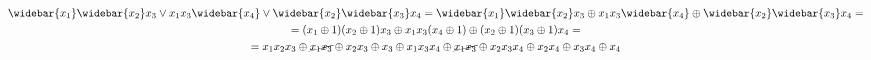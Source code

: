 \begin{multline*}
    \widebar{x_1}\widebar{x_2}x_3 \lor x_1x_3\widebar{x_4} \lor \widebar{x_2}\widebar{x_3}x_4=\widebar{x_1}\widebar{x_2}x_3 \oplus x_1x_3\widebar{x_4} \oplus \widebar{x_2}\widebar{x_3}x_4=\\
=(x_1 \oplus 1)(x_2 \oplus 1)x_3 \oplus x_1x_3(x_4 \oplus 1) \oplus (x_2 \oplus 1)(x_3 \oplus 1)x_4=\\
=x_1x_2x_3 \oplus \cancel{x_1x_3} \oplus x_2x_3 \oplus x_3 \oplus x_1x_3x_4 \oplus \cancel{x_1x_3} \oplus x_2x_3x_4 \oplus x_2x_4 \oplus x_3x_4 \oplus x_4\\
\end{multline*}